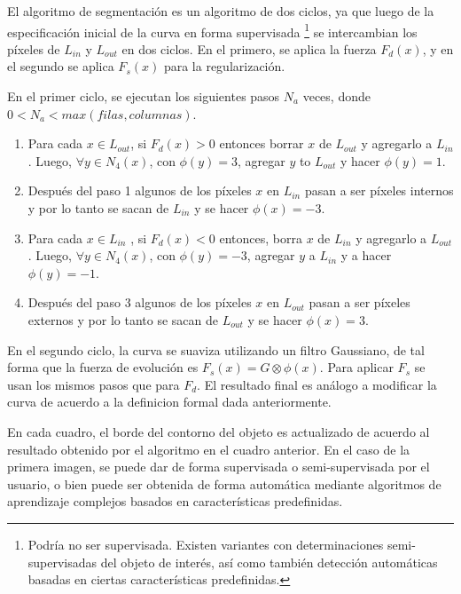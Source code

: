 \documentclass[a4paper,10pt]{article}
\begin{document}
El algoritmo de segmentación es un algoritmo de dos ciclos, ya que luego de la
especificación inicial de la curva en forma supervisada \footnote{Podría no ser
supervisada. Existen variantes con determinaciones semi-supervisadas del objeto
de interés, así como también detección automáticas basadas en ciertas
características predefinidas.} se intercambian los píxeles de $L_{in}$ y
$L_{out}$ en dos ciclos. En el primero, se aplica la fuerza $F_{d}(x)$, y en el
segundo se aplica $F_{s}(x)$ para la regularización.

En el primer ciclo, se ejecutan los siguientes pasos $N_{a}$ veces, donde $ 0 <
N_{a} < max(filas, columnas)$.

\begin{enumerate}

    \item Para cada $x \in L_{out}$, si $F_{d}(x) > 0$ entonces borrar $x$ de
$L_{out}$ y agregarlo a $L_{in}$. Luego, $\forall y \in N_{4}(x)$, con $\phi(y)
= 3$, agregar $y$ to $L_{out}$ y hacer $\phi(y) = 1$.

    \item Después del paso 1 algunos de los píxeles $x$ en $L_{in}$ pasan a ser
píxeles internos y por lo tanto se sacan de $L_{in}$ y se hacer $\phi(x) = -3$.

    \item Para cada $x \in L_{in}$ , si $F_{d}(x) < 0$ entonces, borra $x$ de
$L_{in}$ y agregarlo a $L_{out}$. Luego, $\forall y \in N_{4}(x)$, con $\phi(y)
= -3$, agregar $y$ a $L_{in}$ y a hacer $\phi(y) = -1$.


    \item Después del paso 3 algunos de los píxeles $x$ en $L_{out}$ pasan a
ser píxeles externos y por lo tanto se sacan de $L_{out}$ y se hacer $\phi(x) =
3$.

\end{enumerate}

En el segundo ciclo, la curva se suaviza utilizando un filtro Gaussiano, de tal
forma que la fuerza de evolución es $F_{s}(x) = G \otimes \phi(x)$. Para aplicar $F_s$ se usan los mismos
pasos que para $F_d$. El resultado final es análogo a modificar la curva de acuerdo 
a la definicion formal dada anteriormente.

En cada cuadro, el borde del contorno del objeto es actualizado de acuerdo al
resultado obtenido por el algoritmo en el cuadro anterior. En el caso de la
primera imagen, se puede dar de forma supervisada o semi-supervisada por el
usuario, o bien puede ser obtenida de forma automática mediante algoritmos de
aprendizaje complejos basados en características predefinidas.
\end{document}
